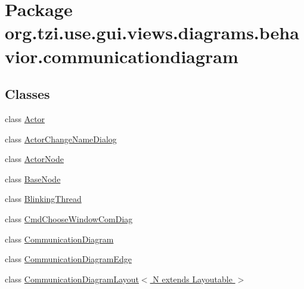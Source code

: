 \hypertarget{namespaceorg_1_1tzi_1_1use_1_1gui_1_1views_1_1diagrams_1_1behavior_1_1communicationdiagram}{\section{Package org.\-tzi.\-use.\-gui.\-views.\-diagrams.\-behavior.\-communicationdiagram}
\label{namespaceorg_1_1tzi_1_1use_1_1gui_1_1views_1_1diagrams_1_1behavior_1_1communicationdiagram}
}
\subsection*{Classes}
\begin{DoxyCompactItemize}
\item 
class \hyperlink{classorg_1_1tzi_1_1use_1_1gui_1_1views_1_1diagrams_1_1behavior_1_1communicationdiagram_1_1_actor}{Actor}
\item 
class \hyperlink{classorg_1_1tzi_1_1use_1_1gui_1_1views_1_1diagrams_1_1behavior_1_1communicationdiagram_1_1_actor_change_name_dialog}{Actor\-Change\-Name\-Dialog}
\item 
class \hyperlink{classorg_1_1tzi_1_1use_1_1gui_1_1views_1_1diagrams_1_1behavior_1_1communicationdiagram_1_1_actor_node}{Actor\-Node}
\item 
class \hyperlink{classorg_1_1tzi_1_1use_1_1gui_1_1views_1_1diagrams_1_1behavior_1_1communicationdiagram_1_1_base_node}{Base\-Node}
\item 
class \hyperlink{classorg_1_1tzi_1_1use_1_1gui_1_1views_1_1diagrams_1_1behavior_1_1communicationdiagram_1_1_blinking_thread}{Blinking\-Thread}
\item 
class \hyperlink{classorg_1_1tzi_1_1use_1_1gui_1_1views_1_1diagrams_1_1behavior_1_1communicationdiagram_1_1_cmd_choose_window_com_diag}{Cmd\-Choose\-Window\-Com\-Diag}
\item 
class \hyperlink{classorg_1_1tzi_1_1use_1_1gui_1_1views_1_1diagrams_1_1behavior_1_1communicationdiagram_1_1_communication_diagram}{Communication\-Diagram}
\item 
class \hyperlink{classorg_1_1tzi_1_1use_1_1gui_1_1views_1_1diagrams_1_1behavior_1_1communicationdiagram_1_1_communication_diagram_edge}{Communication\-Diagram\-Edge}
\item 
class \hyperlink{classorg_1_1tzi_1_1use_1_1gui_1_1views_1_1diagrams_1_1behavior_1_1communicationdiagram_1_1_commuf54f98cd7b651f04d6ed507c9c374b00}{Communication\-Diagram\-Layout$<$ N extends Layoutable $>$}

\end{DoxyCompactItemize}
